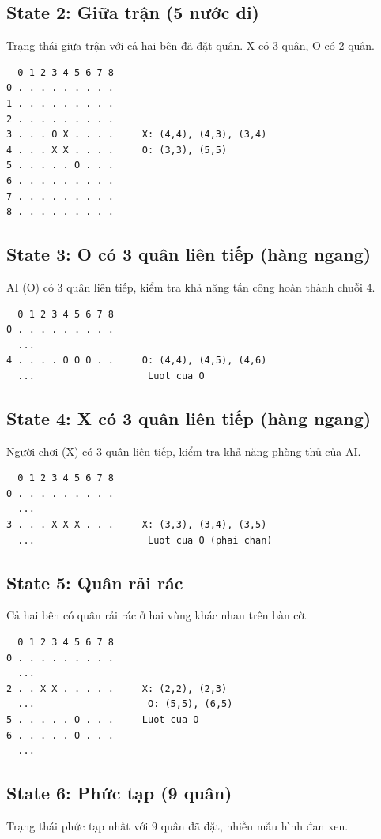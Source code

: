 \documentclass[12pt,a4paper]{article}
\begin{document}
\subsection{State 2: Giữa trận (5 nước đi)}
Trạng thái giữa trận với cả hai bên đã đặt quân. X có 3 quân, O có 2 quân.

\begin{verbatim}
  0 1 2 3 4 5 6 7 8
0 . . . . . . . . .
1 . . . . . . . . .
2 . . . . . . . . .
3 . . . O X . . . .     X: (4,4), (4,3), (3,4)
4 . . . X X . . . .     O: (3,3), (5,5)
5 . . . . . O . . .
6 . . . . . . . . .
7 . . . . . . . . .
8 . . . . . . . . .
\end{verbatim}

\subsection{State 3: O có 3 quân liên tiếp (hàng ngang)}
AI (O) có 3 quân liên tiếp, kiểm tra khả năng tấn công hoàn thành chuỗi 4.

\begin{verbatim}
  0 1 2 3 4 5 6 7 8
0 . . . . . . . . .
  ...
4 . . . . O O O . .     O: (4,4), (4,5), (4,6)
  ...                    Luot cua O
\end{verbatim}

\subsection{State 4: X có 3 quân liên tiếp (hàng ngang)}
Người chơi (X) có 3 quân liên tiếp, kiểm tra khả năng phòng thủ của AI.

\begin{verbatim}
  0 1 2 3 4 5 6 7 8
0 . . . . . . . . .
  ...
3 . . . X X X . . .     X: (3,3), (3,4), (3,5)
  ...                    Luot cua O (phai chan)
\end{verbatim}

\subsection{State 5: Quân rải rác}
Cả hai bên có quân rải rác ở hai vùng khác nhau trên bàn cờ.

\begin{verbatim}
  0 1 2 3 4 5 6 7 8
0 . . . . . . . . .
  ...
2 . . X X . . . . .     X: (2,2), (2,3)
  ...                    O: (5,5), (6,5)
5 . . . . . O . . .     Luot cua O
6 . . . . . O . . .
  ...
\end{verbatim}

\subsection{State 6: Phức tạp (9 quân)}
Trạng thái phức tạp nhất với 9 quân đã đặt, nhiều mẫu hình đan xen.
\end{document}
